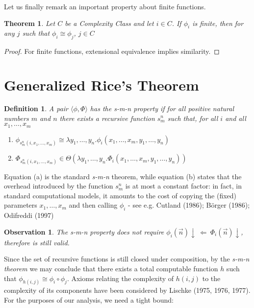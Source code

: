 \documentclass[10pt, a4paper, oneside, titlepage, draft]{article}
\newtheorem{definition}[shrd]{Definition}
\newtheorem{observation}{Observation}[shrd]
\newtheorem{theorem}[shrd]{Theorem}
\begin{document}
Let us finally remark an important property about finite functions.

\begin{theorem}
    Let $C$ be a Complexity Class and let $i \in C$. If $\phi_i$ is finite, then for any $j$ such that $\phi_i \cong \phi_j$, $j \in C$
\end{theorem}

\begin{proof}
    For finite functions, extensional equivalence implies similarity.
\end{proof}

\section{Generalized Rice's Theorem}

\begin{definition}
    A pair $\langle \phi, \Phi \rangle$ has the \emph{s-m-n property} if for all positive natural numbers $m$ and $n$ there exists a recursive function $s_m^n$ such that, for all $i$ and all $x_1, \dots, x_m$ 
    \begin{enumerate}[label=(\alph*)]
        \item $ \phi_{s_m^n (i,x_1,\dots,x_m)} \cong \lambda y_1,\dots,y_n . \phi_i (x_1,\dots,x_m,y_1,\dots,y_n)  $
        \item $ \Phi_{s_m^n (i,x_1,\dots,x_m)} \in  \Theta(\lambda y_1,\dots,y_n . \Phi_i (x_1,\dots,x_m,y_1,\dots,y_n))  $
    \end{enumerate}
\end{definition}

Equation (a) is the standard \emph{s-m-n} theorem, while equation (b) states that the overhead introduced by the function $s_m^n$ is at most a constant factor: in fact, in standard computational models, it amounts to the cost of copying the (fixed) parameters $x_1,\dots,x_m$ and then calling $\phi_i$ - see e.g. Cutland (1986); Börger (1986); Odifreddi (1997)

\begin{observation}
    The s-m-n property does not require $\phi_i(\vec{n})\downarrow \ \Leftarrow \ \Phi_i(\vec{n})\downarrow$, therefore is still valid.
\end{observation}

Since the set of recursive functions is still closed under composition, by the \emph{s-m-n theorem} we may conclude that there exists a total computable function $h$ such that $\phi_{h(i,j)} \cong \phi_i \circ \phi_j $. Axioms relating the complexity of $h(i,j)$ to the complexity of its components have been considered by Lischke (1975, 1976, 1977). For the purposes of our analysis, we need a tight bound:
\end{document}
